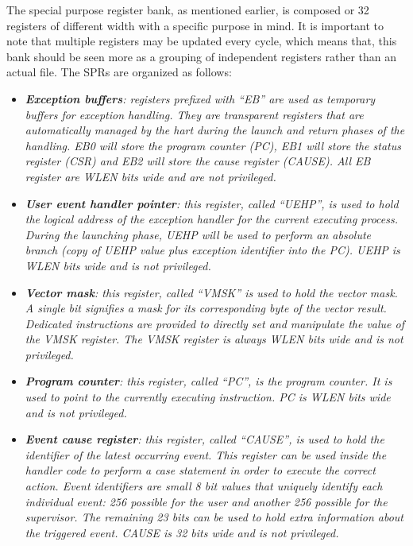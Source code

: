             The special purpose register bank, as mentioned earlier, is composed or 32 registers of different width with a specific purpose in mind. It is important to note that multiple registers may be updated every cycle, which means that, this bank should be seen more as a grouping of independent registers rather than an actual file. The SPRs are organized as follows:

            \begin{itemize}

                \item \textit{\textbf{Exception buffers}: registers prefixed with ``EB'' are used as temporary buffers for exception handling. They are transparent registers that are automatically managed by the hart during the launch and return phases of the handling. EB0 will store the program counter (PC), EB1 will store the status register (CSR) and EB2 will store the cause register (CAUSE). All EB register are WLEN bits wide and are not privileged.}

                \item \textit{\textbf{User event handler pointer}: this register, called ``UEHP'', is used to hold the logical address of the exception handler for the current executing process. During the launching phase, UEHP will be used to perform an absolute branch (copy of UEHP value plus exception identifier into the PC). UEHP is WLEN bits wide and is not privileged.}

                \item \textit{\textbf{Vector mask}: this register, called ``VMSK'' is used to hold the vector mask. A single bit signifies a mask for its corresponding byte of the vector result. Dedicated instructions are provided to directly set and manipulate the value of the VMSK register. The VMSK register is always WLEN bits wide and is not privileged.}

                \item \textit{\textbf{Program counter}: this register, called ``PC'', is the program counter. It is used to point to the currently executing instruction. PC is WLEN bits wide and is not privileged.}

                \item \textit{\textbf{Event cause register}: this register, called ``CAUSE'', is used to hold the identifier of the latest occurring event. This register can be used inside the handler code to perform a case statement in order to execute the correct action. Event identifiers are small 8 bit values that uniquely identify each individual event: 256 possible for the user and another 256 possible for the supervisor. The remaining 23 bits can be used to hold extra information about the triggered event. CAUSE is 32 bits wide and is not privileged.}


\end{itemize}
